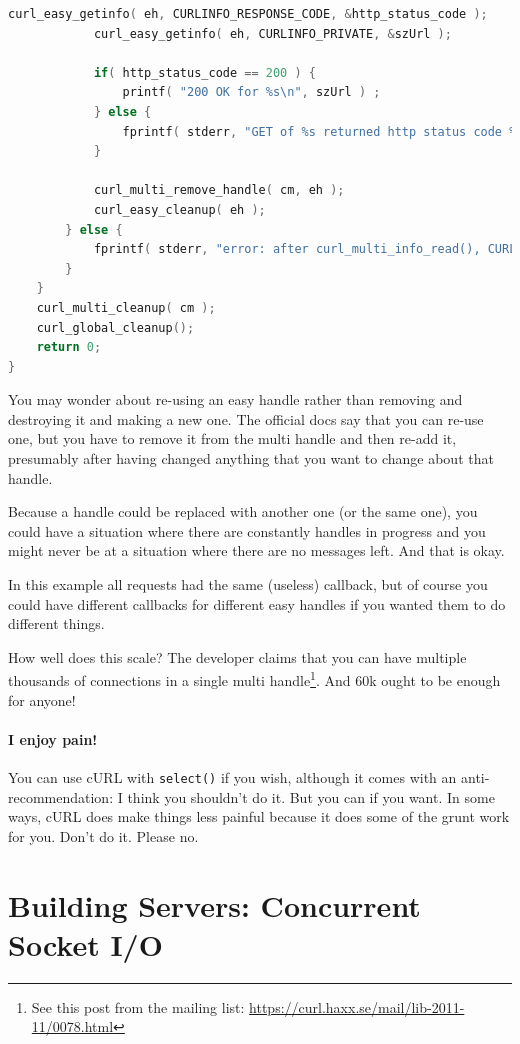 \begin{lstlisting}[language=C]
            curl_easy_getinfo( eh, CURLINFO_RESPONSE_CODE, &http_status_code );
            curl_easy_getinfo( eh, CURLINFO_PRIVATE, &szUrl );

            if( http_status_code == 200 ) {
                printf( "200 OK for %s\n", szUrl ) ;
            } else {
                fprintf( stderr, "GET of %s returned http status code %d\n", szUrl, http_status_code );
            }

            curl_multi_remove_handle( cm, eh );
            curl_easy_cleanup( eh );
        } else {
            fprintf( stderr, "error: after curl_multi_info_read(), CURLMsg=%d\n", msg->msg );
        }
    }
    curl_multi_cleanup( cm );
    curl_global_cleanup();
    return 0;
}
\end{lstlisting}

You may wonder about re-using an easy handle rather than removing and destroying it and making a new one. The official docs say that you can re-use one, but you have to remove it from the multi handle and then re-add it, presumably after having changed anything that you want to change about that handle. 

Because a handle could be replaced with another one (or the same one), you could have a situation where there are constantly handles in progress and you might never be at a situation where there are no messages left. And that is okay.

In this example all requests had the same (useless) callback, but of course you could have different callbacks for different easy handles if you wanted them to do different things.

How well does this scale? The developer claims that you can have multiple thousands of connections in a single multi handle\footnote{See this post from the mailing list: \url{https://curl.haxx.se/mail/lib-2011-11/0078.html}}. And 60k ought to be enough for anyone!

\paragraph{I enjoy pain!} You can use cURL with \texttt{select()} if you wish, although it comes with an anti-recommendation: I think you shouldn't do it. But you can if you want. In some ways, cURL does make things less painful because it does some of the grunt work for you. Don't do it. Please no.

\section*{Building Servers: Concurrent Socket I/O}

